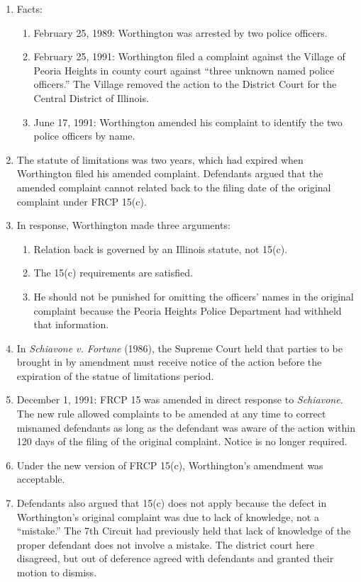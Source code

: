 \begin{enumerate}
    \item Facts:
    \begin{enumerate}
        \item February 25, 1989: Worthington was arrested by two police 
        officers.
        \item February 25, 1991: Worthington filed a complaint against the 
        Village of Peoria Heights in county court against ``three unknown 
        named police officers.'' The Village removed the action to the 
        District Court for the Central District of Illinois.
        \item June 17, 1991: Worthington amended his complaint to identify the 
        two police officers by name.
    \end{enumerate}
    \item The statute of limitations was two years, which had expired when 
    Worthington filed his amended complaint. Defendants argued that the 
    amended complaint cannot related back to the filing date of the original 
    complaint under FRCP 15(c).
    \item In response, Worthington made three arguments:
    \begin{enumerate}
        \item Relation back is governed by an Illinois statute, not 15(c).
        \item The 15(c) requirements are satisfied.
        \item He should not be punished for omitting the officers' names in 
        the original complaint because the Peoria Heights Police Department 
        had withheld that information.
    \end{enumerate}
    \item In \emph{Schiavone v. Fortune} (1986), the Supreme Court held that 
    parties to be brought in by amendment must receive notice of the action 
    before the expiration of the statue of limitations period.
    \item December 1, 1991: FRCP 15 was amended in direct response to 
    \emph{Schiavone}. The new rule allowed complaints to be amended at any 
    time to correct misnamed defendants as long as the defendant was aware of 
    the action within 120 days of the filing of the original complaint. Notice 
    is no longer required.
    \item Under the new version of FRCP 15(c), Worthington's amendment was 
    acceptable.
    \item Defendants also argued that 15(c) does not apply because the defect 
    in Worthington's original complaint was due to lack of knowledge, not a 
    ``mistake.'' The 7th Circuit had previously held that lack of knowledge of 
    the proper defendant does not involve a mistake. The district court here 
    disagreed, but out of deference agreed with defendants and granted their 
    motion to dismiss.
\end{enumerate}



